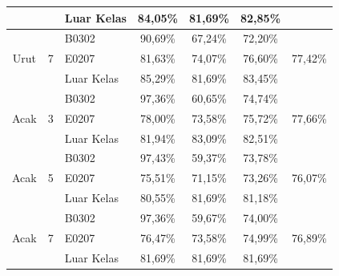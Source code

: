 \begin{enumerate}[a.]
\begin{enumerate}
\begin{table}[H]
\begin{tabular}{|c|c|l|c|c|c|c|}
			                            &                    & Luar Kelas                       & 84,05\%   & 81,69\% & 82,85\%   &                          \\ \hline
			      \multirow{3}{*}{Urut} & \multirow{3}{*}{7} & B0302                            & 90,69\%   & 67,24\% & 72,20\%   & \multirow{3}{*}{77,42\%} \\ \cline{3-6}
			                            &                    & E0207                            & 81,63\%   & 74,07\% & 76,60\%   &                          \\ \cline{3-6}
			                            &                    & Luar Kelas                       & 85,29\%   & 81,69\% & 83,45\%   &                          \\ \hline
			      \multirow{3}{*}{Acak} & \multirow{3}{*}{3} & B0302                            & 97,36\%   & 60,65\% & 74,74\%   & \multirow{3}{*}{77,66\%} \\ \cline{3-6}
			                            &                    & E0207                            & 78,00\%   & 73,58\% & 75,72\%   &                          \\ \cline{3-6}
			                            &                    & Luar Kelas                       & 81,94\%   & 83,09\% & 82,51\%   &                          \\ \hline
			      \multirow{3}{*}{Acak} & \multirow{3}{*}{5} & B0302                            & 97,43\%   & 59,37\% & 73,78\%   & \multirow{3}{*}{76,07\%} \\ \cline{3-6}
			                            &                    & E0207                            & 75,51\%   & 71,15\% & 73,26\%   &                          \\ \cline{3-6}
			                            &                    & Luar Kelas                       & 80,55\%   & 81,69\% & 81,18\%   &                          \\ \hline
			      \multirow{3}{*}{Acak} & \multirow{3}{*}{7} & B0302                            & 97,36\%   & 59,67\% & 74,00\%   & \multirow{3}{*}{76,89\%} \\ \cline{3-6}
			                            &                    & E0207                            & 76,47\%   & 73,58\% & 74,99\%   &                          \\ \cline{3-6}
			                            &                    & Luar Kelas                       & 81,69\%   & 81,69\% & 81,69\%   &                          \\ \hline
		      \end{tabular}
	      \end{table}



\end{enumerate}
\end{enumerate}
